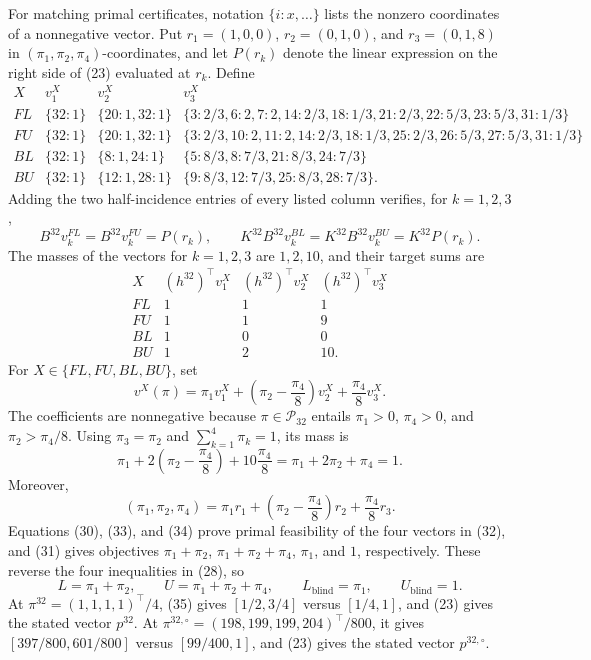 For matching primal certificates, notation \(\{i:x,\ldots\}\) lists the nonzero coordinates of a nonnegative vector.  Put \(r_1=(1,0,0)\), \(r_2=(0,1,0)\), and \(r_3=(0,1,8)\) in \((\pi_1,\pi_2,\pi_4)\)-coordinates, and let \(P(r_k)\) denote the linear expression on the right side of (23) evaluated at \(r_k\).  Define
\[
\begin{array}{c|c|c|l}
X&v_1^X&v_2^X&v_3^X\\\hline
FL&\{32:1\}&\{20:1,32:1\}&
\{3:2/3,6:2,7:2,14:2/3,18:1/3,21:2/3,22:5/3,23:5/3,31:1/3\}\\
FU&\{32:1\}&\{20:1,32:1\}&
\{3:2/3,10:2,11:2,14:2/3,18:1/3,25:2/3,26:5/3,27:5/3,31:1/3\}\\
BL&\{32:1\}&\{8:1,24:1\}&
\{5:8/3,8:7/3,21:8/3,24:7/3\}\\
BU&\{32:1\}&\{12:1,28:1\}&
\{9:8/3,12:7/3,25:8/3,28:7/3\}.
\end{array}
\tag{29}
\]
Adding the two half-incidence entries of every listed column verifies, for \(k=1,2,3\),
\[
B^{32}v_k^{FL}=B^{32}v_k^{FU}=P(r_k),
\qquad
K^{32}B^{32}v_k^{BL}=K^{32}B^{32}v_k^{BU}=K^{32}P(r_k).
\tag{30}
\]
The masses of the vectors for \(k=1,2,3\) are \(1,2,10\), and their target sums are
\[
\begin{array}{c|ccc}
X&(h^{32})^{\top}v_1^X&(h^{32})^{\top}v_2^X&(h^{32})^{\top}v_3^X\\\hline
FL&1&1&1\\
FU&1&1&9\\
BL&1&0&0\\
BU&1&2&10.
\end{array}
\tag{31}
\]
For \(X\in\{FL,FU,BL,BU\}\), set
\[
v^X(\pi)=\pi_1v_1^X+\left(\pi_2-\frac{\pi_4}{8}\right)v_2^X
+\frac{\pi_4}{8}v_3^X.
\tag{32}
\]
The coefficients are nonnegative because \(\pi\in\mathcal P_{32}\) entails \(\pi_1>0\), \(\pi_4>0\), and \(\pi_2>\pi_4/8\).  Using \(\pi_3=\pi_2\) and \(\sum_{k=1}^4\pi_k=1\), its mass is
\[
\pi_1+2\left(\pi_2-\frac{\pi_4}{8}\right)
+10\frac{\pi_4}{8}
=\pi_1+2\pi_2+\pi_4=1.
\tag{33}
\]
Moreover,
\[
(\pi_1,\pi_2,\pi_4)
=\pi_1r_1+\left(\pi_2-\frac{\pi_4}{8}\right)r_2
+\frac{\pi_4}{8}r_3.
\tag{34}
\]
Equations (30), (33), and (34) prove primal feasibility of the four vectors in (32), and (31) gives objectives \(\pi_1+\pi_2\), \(\pi_1+\pi_2+\pi_4\), \(\pi_1\), and \(1\), respectively.  These reverse the four inequalities in (28), so
\[
L=\pi_1+\pi_2,\qquad
U=\pi_1+\pi_2+\pi_4,\qquad
L_{\mathrm{blind}}=\pi_1,\qquad
U_{\mathrm{blind}}=1.
\tag{35}
\]
At \(\pi^{32}=(1,1,1,1)^{\top}/4\), (35) gives \([1/2,3/4]\) versus \([1/4,1]\), and (23) gives the stated vector \(p^{32}\).  At \(\pi^{32,\circ}=(198,199,199,204)^{\top}/800\), it gives \([397/800,601/800]\) versus \([99/400,1]\), and (23) gives the stated vector \(p^{32,\circ}\).

